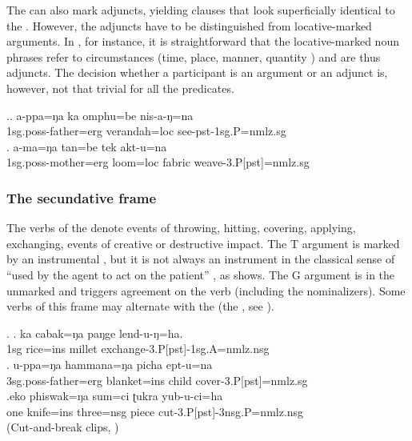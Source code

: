 The  can also mark adjuncts, yielding clauses that look superficially identical to the . However, the adjuncts have to be distinguished from locative-marked arguments. In \Next, for instance, it is straightforward that the locative-marked noun phrases refer to  circumstances (time, place, manner, quantity \citealt[108]{Tesniere1959Elements}) and are thus adjuncts. The decision whether a participant is an argument or an adjunct is, however, not that trivial for all the predicates.

\ex.\ag. a-ppa=ŋa ka omphu=be nis-a-ŋ=na \\
{\sc 1sg.poss-}father{\sc =erg}  verandah{\sc =loc} see{\sc -pst-1sg.P=nmlz.sg}\\
\bg. a-ma=ŋa tan=be tek akt-u=na\\
{\sc 1sg.poss-}mother{\sc =erg} loom{\sc =loc} fabric weave{\sc -3.P[pst]=nmlz.sg}\\
 
\subsubsection{The secundative frame}


\noindent
The verbs of the  denote events of throwing, hitting, covering, applying, exchanging, events of creative or destructive impact. The T argument is marked by an instrumental , but it is not always an instrument in the classical sense of “used by the agent to act on the patient” \citep{Andrews1985The-major}, as \Next[a] shows. The G argument is  in the unmarked  and triggers agreement on the verb (including the nominalizers). Some verbs of this frame may alternate with the  (the , see ).

\ex. \ag. ka cabak=ŋa paŋge lend-u-ŋ=ha.\\
		1sg rice{\sc =ins} millet exchange-{\sc 3.P[pst]-1sg.A=nmlz.nsg}	\\
	\bg. u-ppa=ŋa hammana=ŋa picha ept-u=na\\
	{\sc 3sg.poss-}father{\sc =erg}  blanket{\sc =ins} child cover{\sc -3.P[pst]=nmlz.sg}\\
\bg.eko phiswak=ŋa sum=ci ʈukra yub-u-ci=ha\\
one knife{\sc =ins} three{\sc =nsg} piece cut{\sc -3.P[pst]-3nsg.P=nmlz.nsg}\\
 (Cut-and-break clips, \citealt{Bohnemeyeretal2010_cut})

